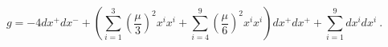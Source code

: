 \begin{equation}
 g = -4 d x^+ d x^- + \left(\sum_{i=1}^3 \left(\frac{\mu}{3}\right)^2x^i x^i 
  +  \sum_{i=4}^9 \left(\frac{\mu}{6}\right)^2 x^i x^i \right)dx^+ dx^+ 
  + \sum_{i=1}^9 d x^i dx^i ~.
\end{equation}

